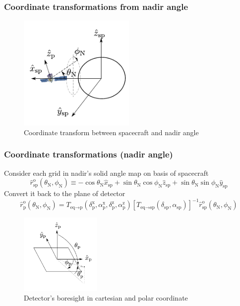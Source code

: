 \documentclass{beamer}
\begin{document}
\begin{frame}\frametitle{Coordinate transformations from nadir angle}
  \begin{figure}[h!]
    \centering
    \includegraphics[width=0.5\textwidth]{img/fig_coordinate/coord_eq_p.pdf}
    \caption{Coordinate transform between spacecraft and nadir angle}
  \end{figure}
\end{frame}
\begin{frame}\frametitle{Coordinate transformations (nadir angle)}
  Consider each grid in nadir's solid angle map on basis of spacecraft
  \begin{equation}
    \hat{r}^\text{o}_\text{sp} (\theta_\text{N}, \phi_\text{N}) \equiv -\cos\theta_\text{N}\hat{x}_\text{sp} + \sin\theta_\text{N}\cos\phi_\text{N}\hat{z}_\text{sp} + \sin\theta_\text{N}\sin\phi_\text{N}\hat{y}_\text{sp}
    \label{eq:def_r0}
\end{equation}
Convert it back to the plane of detector
\begin{equation}
    \hat{r}^\text{o}_\text{p} (\theta_\text{N}, \phi_\text{N}) = T_{\text{eq}\rightarrow\text{p}} (\delta^\text{x}_\text{p}, \alpha^\text{x}_\text{p}, \delta^\text{z}_\text{p}, \alpha^\text{z}_\text{p}) \left[T_{\text{eq}\rightarrow\text{sp}} (\delta_\text{sp}, \alpha_\text{sp})\right]^{-1} \hat{r}^\text{o}_\text{sp} (\theta_\text{N}, \phi_\text{N})
    \label{eq:def_r0_to_rp}
\end{equation}
\begin{figure}[h!]
  \centering
  \includegraphics[width=0.35\textwidth]{img/fig_coordinate/coord_plane.pdf}
  \caption{Detector's boresight in cartesian and polar coordinate}
  \label{fig:tf_lat_pol_car}
\end{figure}
\end{frame}
\end{document}

